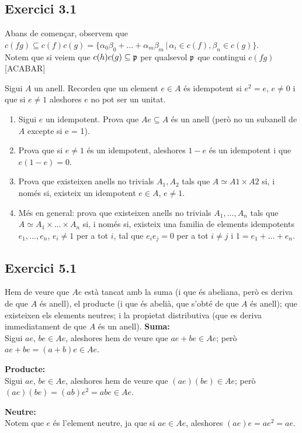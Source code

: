\documentclass[11pt, a4paper]{article}
\begin{document}
\subsection{Exercici 3.1}
Abans de començar, observem que $c(fg)\subseteq c(f)c(g)=\{\alpha_0\beta_0+\dots+\alpha_m\beta_m\,|\,\alpha_i\in c(f), \beta_n\in c(g)\}$.\\
Notem que si veiem que $c(h)c(g)\subseteq \mathfrak p$ per qualsevol $\mathfrak p$ que contingui $c(fg)$ [ACABAR]
\newpage
\begin{tcolorbox}[title=\section{Exercici 5}]
    Sigui $A$ un anell. Recordeu que un element $e \in A$ és idempotent si $e^2 = e$, $e \neq 0$ i que si $e \neq 1$ aleshores $e$ no pot ser un unitat.
    \begin{enumerate}
        \item Sigui $e$ un idempotent. Prova que $Ae \subseteq A$ és un anell (però no un subanell de $A$ excepte si e = 1).
        \item Prova que si $e \neq 1$ és un idempotent, aleshores $1 - e$ és un idempotent i que $e(1 - e) = 0$.
        \item Prova que existeixen anells no trivials $A_1, A_2$ tals que $A \simeq A1 \times A2$ si, i només si, existeix un idempotent $e \in A$, $e \neq 1$.
        \item Més en general: prova que existeixen anells no trivials $A_1, \dots , A_n$ tals que $A \simeq A_1 \times \dots \times A_n$ si, i només si, existeix una familia de elements idempotents $e_1, \dots , e_n$, $e_i \neq 1$ per a tot $i$, tal que $e_ie_j = 0$ per a tot $i \neq j$ i $1 = e_1 + \dots + e_n$.
    \end{enumerate}
\end{tcolorbox}
\subsection{Exercici 5.1}
\sloppy
Hem de veure que $Ae$ està tancat amb la suma (i que és abeliana, però es deriva de que $A$ és anell), el producte (i que és abelià, que s'obté de que $A$ és anell); que existeixen els elements neutres; i la propietat distributiva (que es deriva immediatament de que $A$ és un anell).
\textbf{Suma:}\\
Sigui $ae$, $be\in Ae$, aleshores hem de veure que $ae+be\in Ae$; però $ae+be=(a+b)e\in Ae$.\par
\textbf{Producte:}\\
Sigui $ae$, $be\in Ae$, aleshores hem de veure que $(ae)(be)\in Ae$; però $(ae)(be)=(ab)e^2=abe\in Ae$.\par
\textbf{Neutre:}\\
Notem que $e$ és l'element neutre, ja que si $ae\in Ae$, aleshores $(ae)e=ae^2=ae$.
\end{document}
